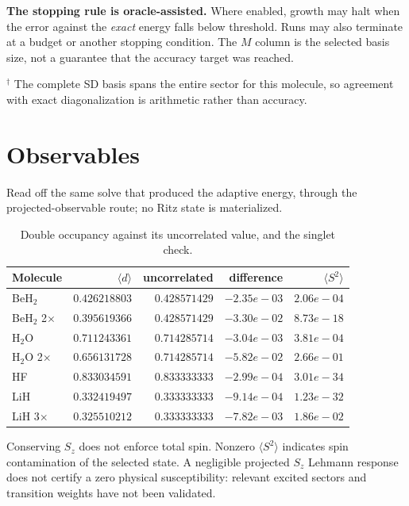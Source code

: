 \documentclass[11pt]{article}
\begin{document}
\noindent\textbf{The stopping rule is oracle-assisted.} Where enabled, growth may halt when the error against the \emph{exact} energy falls below threshold. Runs may also terminate at a budget or another stopping condition. The $M$ column is the selected basis size, not a guarantee that the accuracy target was reached.

\noindent$^\dagger$ The complete SD basis spans the entire sector for this molecule, so agreement with exact diagonalization is arithmetic rather than accuracy.

\section{Observables}

Read off the same solve that produced the adaptive energy, through the projected-observable route; no Ritz state is materialized.

\begin{table}[h]
\centering
\caption{Double occupancy against its uncorrelated value, and the singlet check.}
\begin{tabular}{lrrrr}
\toprule
Molecule & $\langle d \rangle$ & uncorrelated & difference & $\langle S^2 \rangle$ \\
\midrule
BeH$_2$ & $0.426218803$ & $0.428571429$ & $-2.35e-03$ & $2.06e-04$ \\
BeH$_2$ 2$\times$ & $0.395619366$ & $0.428571429$ & $-3.30e-02$ & $8.73e-18$ \\
H$_2$O & $0.711243361$ & $0.714285714$ & $-3.04e-03$ & $3.81e-04$ \\
H$_2$O 2$\times$ & $0.656131728$ & $0.714285714$ & $-5.82e-02$ & $2.66e-01$ \\
HF & $0.833034591$ & $0.833333333$ & $-2.99e-04$ & $3.01e-34$ \\
LiH & $0.332419497$ & $0.333333333$ & $-9.14e-04$ & $1.23e-32$ \\
LiH 3$\times$ & $0.325510212$ & $0.333333333$ & $-7.82e-03$ & $1.86e-02$ \\
\bottomrule
\end{tabular}
\end{table}

\noindent Conserving $S_z$ does not enforce total spin. Nonzero $\langle S^2\rangle$ indicates spin contamination of the selected state. A negligible projected $S_z$ Lehmann response does not certify a zero physical susceptibility: relevant excited sectors and transition weights have not been validated.
\end{document}
